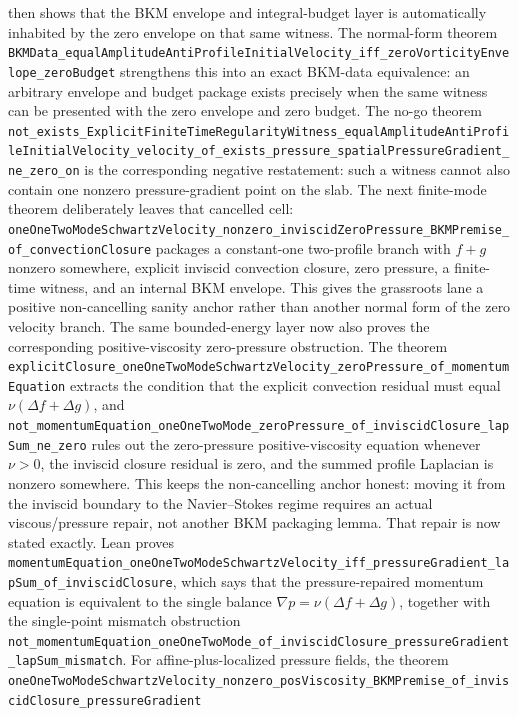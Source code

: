 \documentclass[11pt]{article}
\theoremstyle{remark}
\begin{document}
then shows that the BKM envelope and integral-budget layer is automatically
inhabited by the zero envelope on that same witness.  The normal-form theorem
\texttt{BKMData\_equalAmplitudeAntiProfileInitialVelocity\_iff\_zeroVorticityEnvelope\_zeroBudget}
strengthens this into an exact BKM-data equivalence: an arbitrary envelope and
budget package exists precisely when the same witness can be presented with the
zero envelope and zero budget.  The no-go theorem
\texttt{not\_exists\_ExplicitFiniteTimeRegularityWitness\_equalAmplitudeAntiProfileInitialVelocity\_velocity\_of\_exists\_pressure\_spatialPressureGradient\_ne\_zero\_on}
is the corresponding negative restatement: such a witness cannot also contain
one nonzero pressure-gradient point on the slab.
The next finite-mode theorem deliberately leaves that cancelled cell:
\texttt{oneOneTwoModeSchwartzVelocity\_nonzero\_inviscidZeroPressure\_BKMPremise\_of\_convectionClosure}
packages a constant-one two-profile branch with \(f+g\) nonzero somewhere,
explicit inviscid convection closure, zero pressure, a finite-time witness,
and an internal BKM envelope.  This gives the grassroots lane a positive
non-cancelling sanity anchor rather than another normal form of the zero
velocity branch.
The same bounded-energy layer now also proves the corresponding
positive-viscosity zero-pressure obstruction.  The theorem
\texttt{explicitClosure\_oneOneTwoModeSchwartzVelocity\_zeroPressure\_of\_momentumEquation}
extracts the condition that the explicit convection residual must equal
\(\nu(\Delta f+\Delta g)\), and
\texttt{not\_momentumEquation\_oneOneTwoMode\_zeroPressure\_of\_inviscidClosure\_lapSum\_ne\_zero}
rules out the zero-pressure positive-viscosity equation whenever \(\nu>0\),
the inviscid closure residual is zero, and the summed profile Laplacian is
nonzero somewhere.  This keeps the non-cancelling anchor honest: moving it
from the inviscid boundary to the Navier--Stokes regime requires an actual
viscous/pressure repair, not another BKM packaging lemma.
That repair is now stated exactly.  Lean proves
\texttt{momentumEquation\_oneOneTwoModeSchwartzVelocity\_iff\_pressureGradient\_lapSum\_of\_inviscidClosure},
which says that the pressure-repaired momentum equation is equivalent to the
single balance \(\nabla p=\nu(\Delta f+\Delta g)\), together with the
single-point mismatch obstruction
\texttt{not\_momentumEquation\_oneOneTwoMode\_of\_inviscidClosure\_pressureGradient\_lapSum\_mismatch}.
For affine-plus-localized pressure fields, the theorem
\texttt{oneOneTwoModeSchwartzVelocity\_nonzero\_posViscosity\_BKMPremise\_of\_inviscidClosure\_pressureGradient}
\end{document}

